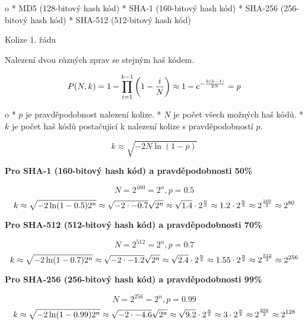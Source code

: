 \begitems \style o
* MD5 (128-bitový hash kód)
* SHA-1 (160-bitový hash kód)
* SHA-256 (256-bitový hash kód)
* SHA-512 (512-bitový hash kód)
\enditems



\sec Kolize 1. řádu

Nalezení dvou různých zprav se stejným haš kódem.

$$
P(N,k) = 1 - \prod^{k-1}_{i=1}\left( 1 - {i \over N} \right)
\approx 1 - e^{-{k(k-1) \over 2N}}= p
$$

\begitems \style o
* $p$ je pravděpodobnost nalezení kolize.
* $N$ je počet všech možných haš kódů.
* $k$ je počet haš kódů postačujicí k nalezení kolize s pravděpodobností $p$.
\enditems

$$k \approx \sqrt{-2N\ln(1 - p)}$$

\bigskip\centerline
{\bf Pro SHA-1 (160-bitový hash kód) a pravděpodobnosti 50\%}

$$N = 2^{160} = 2^n, p = 0.5$$
$$
k \approx \sqrt{-2 \ln(1 - 0.5) 2^n} \approx \sqrt{-2 \cdot -0.7}\sqrt{2^n}
\approx \sqrt{1.4} \cdot 2^{n \over 2} \approx 1.2 \cdot 2^{n \over 2}
\approx 2^{160 \over 2} \approx 2^{80}
$$

\bigskip\centerline
{\bf Pro SHA-512 (512-bitový hash kód) a pravděpodobnosti 70\%}

$$N = 2^{512} = 2^n, p = 0.7$$
$$
k \approx \sqrt{-2 \ln(1 - 0.7) 2^n} \approx \sqrt{-2 \cdot -1.2}\sqrt{2^n}
\approx \sqrt{2.4} \cdot 2^{n \over 2} \approx 1.55 \cdot 2^{n \over 2}
\approx 2^{512 \over 2} \approx 2^{256}
$$

\bigskip\centerline
{\bf Pro SHA-256 (256-bitový hash kód) a pravděpodobnosti 99\%}

$$N = 2^{256} = 2^n, p = 0.99$$
$$
k \approx \sqrt{-2 \ln(1 - 0.99) 2^n} \approx \sqrt{-2 \cdot -4.6}\sqrt{2^n}
\approx \sqrt{9.2} \cdot 2^{n \over 2} \approx 3 \cdot 2^{n \over 2}
\approx 2^{256 \over 2} \approx 2^{128}
$$

